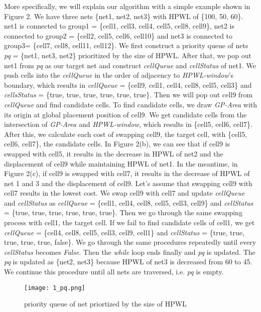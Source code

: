 \documentclass[sigconf,authordraft]{acmart}
\begin{document}
 More specifically, we will explain our algorithm with a simple example shown in Figure 2. 
We have three nets \{net1, net2, net3\} with HPWL of \{100, 50, 60\}. net1 is connected to group1 = \{cell1, cell3, cell4, cell5, cell8, cell9\}, net2 is connected to group2 = \{cell2, cell5, cell6, cell10\} and net3 is connected to group3= \{cell7, cell8, cell11, cell12\}. We first construct a priority queue of nets \textit{pq} = \{net1, net3, net2\} prioritized by the size of HPWL. After that, we pop out net1 from \textit{pq} as our target net and construct \textit{cellQueue} and \textit{cellStatus} of net1. We push cells into the \textit{cellQueue} in the order of adjacency to \textit{HPWL-window}’s boundary, which results in \textit{cellQueue} = \{cell9, cell1, cell4, cell8, cell5, cell3\} and \textit{cellsStatus} = \{true, true, true, true, true, true\}. Then we will pop out cell9 from \textit{cellQueue} and find candidate cells. To find candidate cells, we draw \textit{GP-Area} with its origin at global placement position of cell9. We get candidate cells from the intersection of \textit{GP-Area} and \textit{HPWL-window}, which results in \{cell5, cell6, cell7\}. After this, we calculate each cost of swapping cell9, the target cell, with \{cell5, cell6, cell7\}, the candidate cells. In Figure 2(b), we can see that if cell9 is swapped with cell5, it results in the decrease in HPWL of net2 and the displacement of cell9 while maintaining HPWL of net1. In the meantime, in Figure 2(c), if cell9 is swapped with cell7, it results in the decrease of HPWL of net 1 and 3 and the displacement of cell9. Let’s assume that swapping cell9 with cell7 results in the lowest cost. We swap cell9 with cell7 and update \textit{cellQueue} and \textit{cellStatus} as \textit{cellQueue} = \{cell1, cell4, cell8, cell5, cell3, cell9\} and \textit{cellStatus} = \{true, true, true, true, true, true\}. Then we go through the same swapping process with cell1, the target cell. If we fail to find candidate cells of cell1, we get \textit{cellQueue} = \{cell4, cell8, cell5, cell3, cell9, cell1\} and \textit{cellStatus} = \{true, true, true, true, true, false\}. We go through the same procedures repeatedly until every \textit{cellStatus} becomes \textit{False}. Then the \textit{while} loop ends finally and \textit{pq} is updated. The \textit{pq} is updated as \{net2, net3\} because HPWL of net3 is decreased from 60 to 45. We continue this procedure until all nets are traversed, i.e. \textit{pq} is empty. 

\begin{figure}[h]
  \centering
  \texttt{[image: 1\_pq.png]}
  \caption{priority queue of net priortized by the size of HPWL}
\end{figure}
\end{document}
